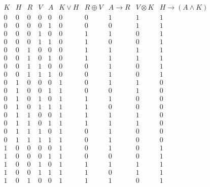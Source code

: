 {{\begin{practices}
            \begin{table}[H]
                \[
                    \begin{array}{c|c|c|c|c|c|c|c|c|c}
                        \hline
                        K & H & R & V & A & K \vee H & R \oplus V & A \rightarrow R & V \otimes K & H \rightarrow (A \wedge K) \\
                        \hline
                        0 & 0 & 0 & 0 & 0 & 0 & 0 & 1 & 1 & 1 \\
                        0 & 0 & 0 & 0 & 1 & 0 & 0 & 0 & 1 & 1 \\
                        0 & 0 & 0 & 1 & 0 & 0 & 1 & 1 & 0 & 1 \\
                        0 & 0 & 0 & 1 & 1 & 0 & 1 & 0 & 0 & 1 \\
                        0 & 0 & 1 & 0 & 0 & 0 & 1 & 1 & 1 & 1 \\
                        0 & 0 & 1 & 0 & 1 & 0 & 1 & 1 & 1 & 1 \\
                        0 & 0 & 1 & 1 & 0 & 0 & 0 & 1 & 0 & 1 \\
                        0 & 0 & 1 & 1 & 1 & 0 & 0 & 1 & 0 & 1 \\
                        0 & 1 & 0 & 0 & 0 & 1 & 0 & 1 & 1 & 0 \\
                        0 & 1 & 0 & 0 & 1 & 1 & 0 & 0 & 1 & 0 \\
                        0 & 1 & 0 & 1 & 0 & 1 & 1 & 1 & 0 & 0 \\
                        0 & 1 & 0 & 1 & 1 & 1 & 1 & 0 & 0 & 0 \\
                        0 & 1 & 1 & 0 & 0 & 1 & 1 & 1 & 1 & 0 \\
                        0 & 1 & 1 & 0 & 1 & 1 & 1 & 1 & 1 & 0 \\
                        0 & 1 & 1 & 1 & 0 & 1 & 0 & 1 & 0 & 0 \\
                        0 & 1 & 1 & 1 & 1 & 1 & 0 & 1 & 0 & 0 \\
                        1 & 0 & 0 & 0 & 0 & 1 & 0 & 1 & 0 & 1 \\
                        1 & 0 & 0 & 0 & 1 & 1 & 0 & 0 & 0 & 1 \\
                        1 & 0 & 0 & 1 & 0 & 1 & 1 & 1 & 1 & 1 \\
                        1 & 0 & 0 & 1 & 1 & 1 & 1 & 0 & 1 & 1 \\
                        1 & 0 & 1 & 0 & 0 & 1 & 1 & 1 & 0 & 1 \\

\end{array}\]
\end{table}
\end{practices}}}
